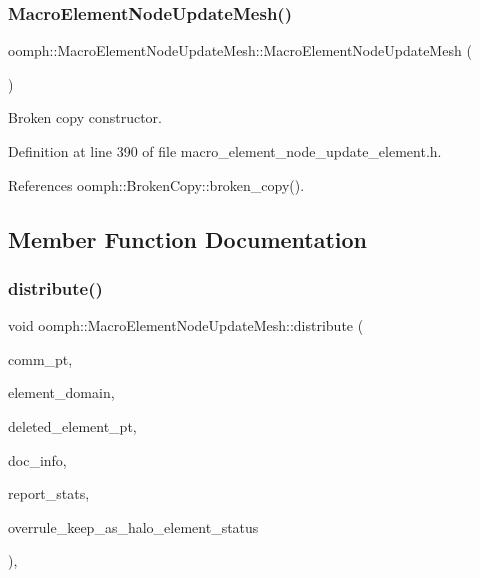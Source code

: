 \subsubsection{\texorpdfstring{Macro\+Element\+Node\+Update\+Mesh()}{MacroElementNodeUpdateMesh()}\hspace{0.1cm}{\footnotesize\ttfamily [2/2]}}
{\footnotesize\ttfamily oomph\+::\+Macro\+Element\+Node\+Update\+Mesh\+::\+Macro\+Element\+Node\+Update\+Mesh (\begin{DoxyParamCaption}\item[{const \hyperlink{classoomph_1_1MacroElementNodeUpdateMesh}{Macro\+Element\+Node\+Update\+Mesh} \&}]{ }\end{DoxyParamCaption})\hspace{0.3cm}{\ttfamily [inline]}}



Broken copy constructor. 



Definition at line 390 of file macro\+\_\+element\+\_\+node\+\_\+update\+\_\+element.\+h.



References oomph\+::\+Broken\+Copy\+::broken\+\_\+copy().



\subsection{Member Function Documentation}
\mbox{\label{classoomph_1_1MacroElementNodeUpdateMesh_ab3712092128e5f47dc664603b0b1776f}} 
\subsubsection{\texorpdfstring{distribute()}{distribute()}}
{\footnotesize\ttfamily void oomph\+::\+Macro\+Element\+Node\+Update\+Mesh\+::distribute (\begin{DoxyParamCaption}\item[{\hyperlink{classoomph_1_1OomphCommunicator}{Oomph\+Communicator} $\ast$}]{comm\+\_\+pt,  }\item[{const \hyperlink{classoomph_1_1Vector}{Vector}$<$ unsigned $>$ \&}]{element\+\_\+domain,  }\item[{\hyperlink{classoomph_1_1Vector}{Vector}$<$ \hyperlink{classoomph_1_1GeneralisedElement}{Generalised\+Element} $\ast$$>$ \&}]{deleted\+\_\+element\+\_\+pt,  }\item[{\hyperlink{classoomph_1_1DocInfo}{Doc\+Info} \&}]{doc\+\_\+info,  }\item[{const bool \&}]{report\+\_\+stats,  }\item[{const bool \&}]{overrule\+\_\+keep\+\_\+as\+\_\+halo\+\_\+element\+\_\+status }\end{DoxyParamCaption})\hspace{0.3cm}{\ttfamily [inline]}, {\ttfamily [virtual]}}



